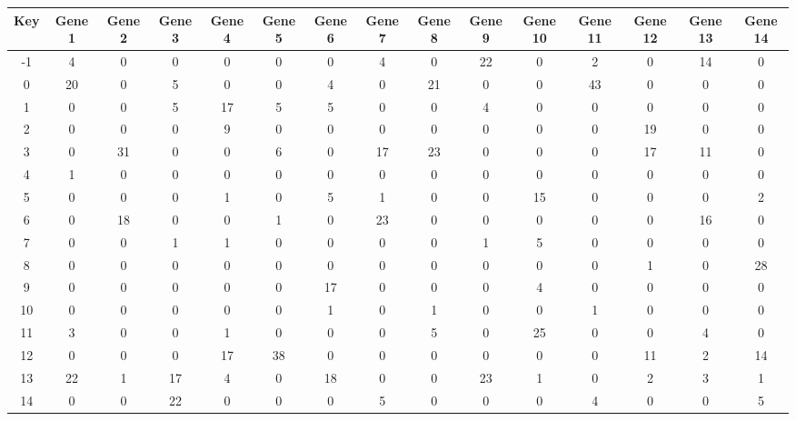 \begin{tabular}{|c|c|c|c|c|c|c|c|c|c|c|c|c|c|c|}
\hline
Key & Gene 1 & Gene 2 & Gene 3 & Gene 4 & Gene 5 & Gene 6 & Gene 7 & Gene 8 & Gene 9 & Gene 10 & Gene 11 & Gene 12 & Gene 13 & Gene 14 \\
\hline
-1 & 4 & 0 & 0 & 0 & 0 & 0 & 4 & 0 & 22 & 0 & 2 & 0 & 14 & 0 \\
0 & 20 & 0 & 5 & 0 & 0 & 4 & 0 & 21 & 0 & 0 & 43 & 0 & 0 & 0 \\
1 & 0 & 0 & 5 & 17 & 5 & 5 & 0 & 0 & 4 & 0 & 0 & 0 & 0 & 0 \\
2 & 0 & 0 & 0 & 9 & 0 & 0 & 0 & 0 & 0 & 0 & 0 & 19 & 0 & 0 \\
3 & 0 & 31 & 0 & 0 & 6 & 0 & 17 & 23 & 0 & 0 & 0 & 17 & 11 & 0 \\
4 & 1 & 0 & 0 & 0 & 0 & 0 & 0 & 0 & 0 & 0 & 0 & 0 & 0 & 0 \\
5 & 0 & 0 & 0 & 1 & 0 & 5 & 1 & 0 & 0 & 15 & 0 & 0 & 0 & 2 \\
6 & 0 & 18 & 0 & 0 & 1 & 0 & 23 & 0 & 0 & 0 & 0 & 0 & 16 & 0 \\
7 & 0 & 0 & 1 & 1 & 0 & 0 & 0 & 0 & 1 & 5 & 0 & 0 & 0 & 0 \\
8 & 0 & 0 & 0 & 0 & 0 & 0 & 0 & 0 & 0 & 0 & 0 & 1 & 0 & 28 \\
9 & 0 & 0 & 0 & 0 & 0 & 17 & 0 & 0 & 0 & 4 & 0 & 0 & 0 & 0 \\
10 & 0 & 0 & 0 & 0 & 0 & 1 & 0 & 1 & 0 & 0 & 1 & 0 & 0 & 0 \\
11 & 3 & 0 & 0 & 1 & 0 & 0 & 0 & 5 & 0 & 25 & 0 & 0 & 4 & 0 \\
12 & 0 & 0 & 0 & 17 & 38 & 0 & 0 & 0 & 0 & 0 & 0 & 11 & 2 & 14 \\
13 & 22 & 1 & 17 & 4 & 0 & 18 & 0 & 0 & 23 & 1 & 0 & 2 & 3 & 1 \\
14 & 0 & 0 & 22 & 0 & 0 & 0 & 5 & 0 & 0 & 0 & 4 & 0 & 0 & 5 \\
\hline
\end{tabular}